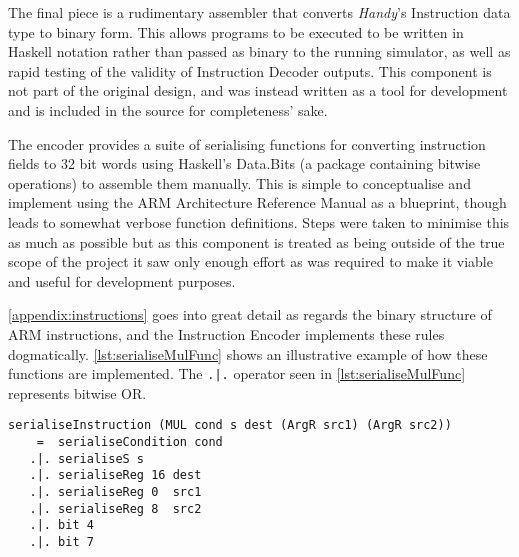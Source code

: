 The final piece is a rudimentary assembler that converts \emph{Handy}'s Instruction data type to binary form. This allows programs to be executed to be written in Haskell notation rather than passed as binary to the running simulator, as well as rapid testing of the validity of Instruction Decoder outputs. This component is not part of the original design, and was instead written as a tool for development and is included in the source for completeness' sake.

The encoder provides a suite of serialising functions for converting instruction fields to 32 bit words using Haskell's Data.Bits (a package containing bitwise operations) to assemble them manually. This is simple to conceptualise and implement using the ARM Architecture Reference Manual\citep{armarm:2005} as a blueprint, though leads to somewhat verbose function definitions. Steps were taken to minimise this as much as possible but as this component is treated as being outside of the true scope of the project it saw only enough effort as was required to make it viable and useful for development purposes.

\autoref{appendix:instructions} goes into great detail as regards the binary structure of ARM instructions, and the Instruction Encoder implements these rules dogmatically. \autoref{lst:serialiseMulFunc} shows an illustrative example of how these functions are implemented. The \lstinline!.|.! operator seen in \autoref{lst:serialiseMulFunc} represents bitwise OR.

\begin{lstlisting}[mathescape,numbers=none,caption={The $serialiseInstruction$ function for MUL},label={lst:serialiseMulFunc}]
serialiseInstruction (MUL cond s dest (ArgR src1) (ArgR src2))
    =  serialiseCondition cond
   .|. serialiseS s
   .|. serialiseReg 16 dest
   .|. serialiseReg 0  src1
   .|. serialiseReg 8  src2
   .|. bit 4
   .|. bit 7
\end{lstlisting}
